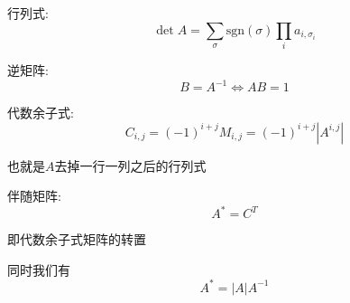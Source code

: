 行列式: $$\det A = \sum_{\sigma} \text{sgn}(\sigma) \prod_{i}a_{i, \sigma_i}$$

逆矩阵: $$B = A^{-1} \iff AB = 1$$

代数余子式: $$C_{i, j} = (-1)^{i + j} M_{i, j} = (-1) ^ {i + j} \left| A ^ {i, j} \right|$$

也就是$A$去掉一行一列之后的行列式

伴随矩阵: $$A^{*} = C^T$$

即代数余子式矩阵的转置

同时我们有 $$ A^{*} = |A| A^{-1}$$